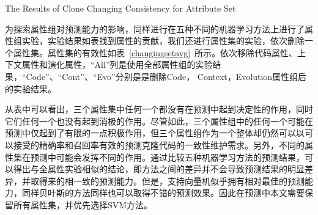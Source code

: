 
{The Results of Clone Changing Consistency for Attribute Set}

为探索属性组对预测能力的影响，同样进行在五种不同的机器学习方法上进行了属性组实验，实验结果如表找到属性的贡献，我们还进行属性集的实验，依次删除一个属性集。属性集的有效性如表~\ref{changingsetavg}~所示。依次移除代码属性、上下文属性和演化属性，“All”列是使用全部属性组的实验结果，“Code”、“Cont”、“Evo”分别是是删除Code， Context，Evolution属性组后的实验结果。

从表中可以看出，三个属性集中任何一个都没有在预测中起到决定性的作用，同时它们任何一个也没有起到消极的作用。尽管如此，三个属性组中的任何一个可能在预测中仅起到了有限的一点积极作用，但三个属性组作为一个整体却仍然可以以可以接受的精确率和召回率有效的预测克隆代码的一致性维护需求。另外，不同的属性集在预测中可能会发挥不同的作用。通过比较五种机器学习方法的预测结果，可以得出与全属性实验相似的结论，即方法之间的差异并不会导致预测结果的明显差异，并取得来的相一致的预测能力。但是，支持向量机似乎拥有相对最佳的预测能力，同样贝叶斯的方法同样也可以取得不错的预测效果。因此在预测中本文需要保留所有属性集，并优先选择SVM方法。

